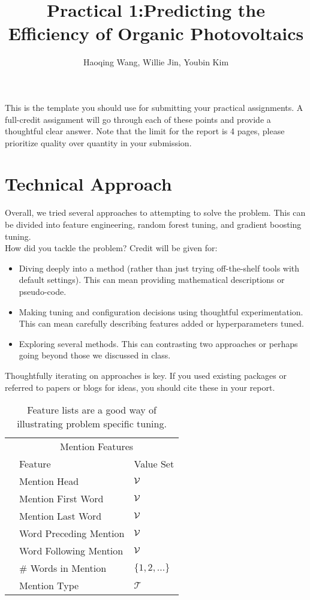 \documentclass[11pt]{article}
\title{Practical 1:Predicting the Efficiency of Organic Photovoltaics}
\author{Haoqing Wang, Willie Jin, Youbin Kim }
\begin{document}
\maketitle{}


\noindent This is the template you should use for submitting your practical assignments. 
A full-credit assignment will go through each of these points and provide a thoughtful 
clear answer.  Note that the limit for the report is 4 pages, please prioritize quality over 
quantity in your submission.

\section{Technical Approach}

Overall, we tried several approaches to attempting to solve the problem. This can be divided into feature engineering, random forest tuning, and gradient boosting tuning. \\


How did you tackle the problem? Credit will be given for:

  \begin{itemize}
  \item Diving deeply into a method (rather than just trying
    off-the-shelf tools with default settings). This can mean 
    providing mathematical descriptions or pseudo-code.
  \item Making tuning and configuration decisions using thoughtful experimentation.  
    This can mean carefully describing features added or hyperparameters tuned.
  \item Exploring several methods. This can contrasting two approaches
    or perhaps going beyond those we discussed in class.
  \end{itemize}

  \noindent Thoughtfully iterating on approaches is key.
  If you used existing packages or referred to papers or blogs for ideas,
  you should cite these in your report. 

  \begin{table}
    \centering
    \begin{tabular}{@{}lll@{}}
      \toprule
      &\multicolumn{2}{c}{Mention Features  } \\
      & Feature & Value Set\\
      \midrule
      & Mention Head & $\mathcal{V}$ \\
      & Mention First Word & $\mathcal{V}$ \\
      & Mention Last Word & $\mathcal{V}$ \\
      & Word Preceding Mention & $\mathcal{V}$ \\
      & Word Following Mention & $\mathcal{V}$\\
      & \# Words in Mention & $\{1, 2, \ldots \}$ \\
      & Mention Type & $\mathcal{T}$ \\
      \bottomrule
      
    \end{tabular}
    \caption{Feature lists are a good way of illustrating problem specific tuning.}
  \end{table}
\end{document}
